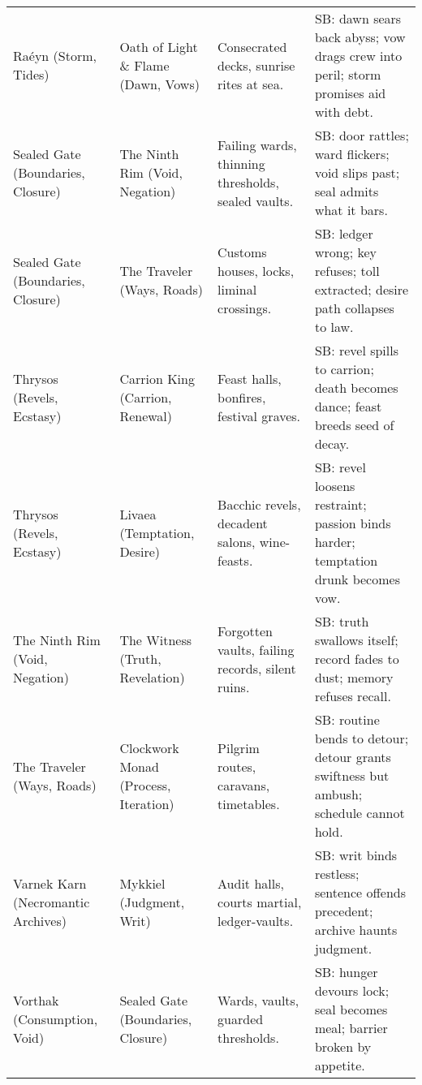 \begin{longtable}{@{}p{3.3cm}p{3.3cm}p{4.6cm}p{7.2cm}@{}}
  Raéyn (Storm, Tides) & Oath of Light \& Flame (Dawn, Vows) &
  Consecrated decks, sunrise rites at sea. &
  SB: dawn sears back abyss; vow drags crew into peril; storm promises aid with debt. \\

  Sealed Gate (Boundaries, Closure) & The Ninth Rim (Void, Negation) &
  Failing wards, thinning thresholds, sealed vaults. &
  SB: door rattles; ward flickers; void slips past; seal admits what it bars. \\

  Sealed Gate (Boundaries, Closure) & The Traveler (Ways, Roads) &
  Customs houses, locks, liminal crossings. &
  SB: ledger wrong; key refuses; toll extracted; desire path collapses to law. \\

  Thrysos (Revels, Ecstasy) & Carrion King (Carrion, Renewal) &
  Feast halls, bonfires, festival graves. &
  SB: revel spills to carrion; death becomes dance; feast breeds seed of decay. \\

  Thrysos (Revels, Ecstasy) & Livaea (Temptation, Desire) &
  Bacchic revels, decadent salons, wine-feasts. &
  SB: revel loosens restraint; passion binds harder; temptation drunk becomes vow. \\

  The Ninth Rim (Void, Negation) & The Witness (Truth, Revelation) &
  Forgotten vaults, failing records, silent ruins. &
  SB: truth swallows itself; record fades to dust; memory refuses recall. \\

  The Traveler (Ways, Roads) & Clockwork Monad (Process, Iteration) &
  Pilgrim routes, caravans, timetables. &
  SB: routine bends to detour; detour grants swiftness but ambush; schedule cannot hold. \\

  Varnek Karn (Necromantic Archives) & Mykkiel (Judgment, Writ) &
  Audit halls, courts martial, ledger-vaults. &
  SB: writ binds restless; sentence offends precedent; archive haunts judgment. \\

  Vorthak (Consumption, Void) & Sealed Gate (Boundaries, Closure) &
  Wards, vaults, guarded thresholds. &
  SB: hunger devours lock; seal becomes meal; barrier broken by appetite. \\

\end{longtable}

